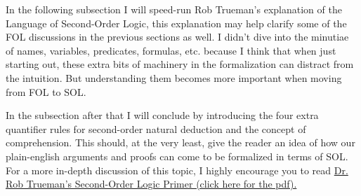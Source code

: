 In the following subsection I will speed-run Rob Trueman's explanation of the Language of Second-Order Logic, this explanation may help clarify some of the FOL discussions in the previous sections as well. 
I didn't dive into the minutiae of names, variables, predicates, formulas, etc. because I think that when just starting out, these extra bits of machinery in the formalization can distract from the intuition. But understanding them becomes more important when moving from FOL to SOL.

In the subsection after that I will conclude by introducing the four extra quantifier rules for second-order natural deduction and the concept of comprehension. This should, at the very least, give the reader an idea of how our plain-english arguments and proofs can come to be formalized in terms of SOL. For a more in-depth 
discussion of this topic, I highly encourage you to read \href{https://www.rtrueman.com/uploads/7/0/3/2/70324387/second-order_logic_primer.pdf}{Dr. Rob Trueman's Second-Order Logic Primer (click here for the pdf).}

